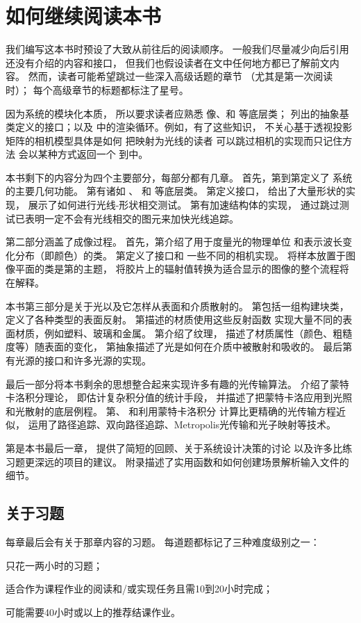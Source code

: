 \section{如何继续阅读本书}\label{sec:如何继续阅读本书}
我们编写这本书时预设了大致从前往后的阅读顺序。
一般我们尽量减少向后引用还没有介绍的内容和接口，
但我们也假设读者在文中任何地方都已了解前文内容。
然而，读者可能希望跳过一些深入高级话题的章节
（尤其是第一次阅读时）；
每个高级章节的标题都标注了星号。

因为系统的模块化本质，
所以要求读者应熟悉
像、和
等底层类；
列出的抽象基类定义的接口；以及
中的渲染循环。例如，有了这些知识，
不关心基于透视投影矩阵的相机模型具体是如何
把映射为光线的读者
可以跳过相机的实现而只记住方法
会以某种方式返回一个
到中。

本书剩下的内容分为四个主要部分，每部分都有几章。
首先，第到第定义了
系统的主要几何功能。
第有诸如
、
和
等底层类。
第定义接口，
给出了大量形状的实现，
展示了如何进行光线-形状相交测试。
第有加速结构体的实现，
通过跳过测试已表明一定不会有光线相交的图元来加快光线追踪。

第二部分涵盖了成像过程。
首先，第介绍了用于度量光的物理单位
和表示波长变化分布（即颜色）的类。
第定义了接口和
一些不同的相机实现。
将样本放置于图像平面的类是第的主题，
将胶片上的辐射值转换为适合显示的图像的整个流程将在解释。

本书第三部分是关于光以及它怎样从表面和介质散射的。
第包括一组构建块类，
定义了各种类型的表面反射。
第描述的材质使用这些反射函数
实现大量不同的表面材质，例如塑料、玻璃和金属。
第介绍了纹理，
描述了材质属性（颜色、粗糙度等）随表面的变化，
第抽象描述了光是如何在介质中被散射和吸收的。
最后第有光源的接口和许多光源的实现。

最后一部分将本书剩余的思想整合起来实现许多有趣的光传输算法。
介绍了蒙特卡洛积分理论，
即估计复杂积分值的统计手段，
并描述了把蒙特卡洛应用到光照和光散射的底层例程。
第、
和利用蒙特卡洛积分
计算比更精确的光传输方程近似，
运用了路径追踪、双向路径追踪、Metropolis光传输和光子映射等技术。

第是本书最后一章，
提供了简短的回顾、关于系统设计决策的讨论
以及许多比练习题更深远的项目的建议。
附录描述了实用函数和如何创建场景解析输入文件的细节。

\subsection{关于习题}\label{sub:关于习题}
每章最后会有关于那章内容的习题。
每道题都标记了三种难度级别之一：

\circleone 只花一两小时的习题；

\circletwo 适合作为课程作业的阅读和/或实现任务且需10到20小时完成；

\circlethree 可能需要40小时或以上的推荐结课作业。
